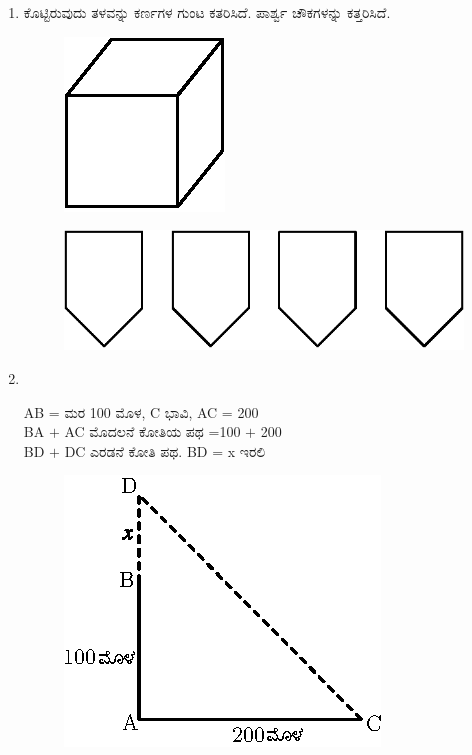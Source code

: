 \begin{enumerate}
\item ಕೊಟ್ಟಿರುವುದು ತಳವನ್ನು ಕರ್ಣಗಳ ಗುಂಟ ಕತರಿಸಿದೆ. ಪಾರ್ಶ್ವ ಚೌಕಗಳನ್ನು ಕತ್ತರಿಸಿದೆ. 
\begin{figure}[H]
\centering
\includegraphics[scale=1.1]{images/chap12/ans22a.eps}
\end{figure}

\begin{figure}[H]
\centering
\includegraphics[scale=1.2]{images/chap12/ans22b.eps}
\end{figure}

\item 
~

\begin{minipage}[c]{4cm}
AB =  ಮರ 100 ಮೊಳ, C ಭಾವಿ, AC = 200\\
BA $+$ AC ಮೊದಲನೆ ಕೋತಿಯ ಪಥ =100 $+$ 200\\
BD $+$ DC ಎರಡನೆ ಕೋತಿ ಪಥ. BD = x ಇರಲಿ 
\end{minipage}
\qquad
\begin{minipage}[c]{4cm}
\begin{figure}[H]
\centering
\includegraphics{images/chap12/ans23.eps}
\end{figure}
\end{minipage}


\end{enumerate}
